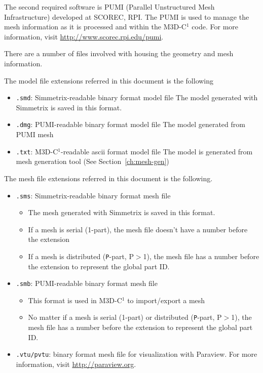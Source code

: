 The second required software is PUMI (Parallel Unstructured Mesh Infrastructure) developed at SCOREC, RPI. The PUMI is used to manage the mesh information as it is processed and within the M3D-C$^{1}$ code. For more information, visit \href{http://www.scorec.rpi.edu/pumi}{http://www.scorec.rpi.edu/pumi}. 

There are a number of files involved with housing the geometry and mesh information. 

The model file extensions referred in this document is the following
\begin{itemize}
\item \texttt{.smd}: Simmetrix-readable binary format model file  
\newline  The model generated with Simmetrix is saved in this format.
\item \texttt{.dmg}: PUMI-readable binary format model file
\newline	The model generated from PUMI mesh
\item	\texttt{.txt}: M3D-C$^{1}$-readable ascii format model file 
\newline	The model is generated from mesh generation tool (See Section~\ref{ch:mesh-gen})
\end{itemize}

The mesh file extensions referred in this document is the following.
\begin{itemize}
\item	\texttt{.sms}: Simmetrix-readable binary format mesh file
\begin{itemize}
\item	The mesh generated with Simmetrix is saved in this format.
\item	If a mesh is serial (1-part), the mesh file doesn't have a number before the extension
\item	If a mesh is distributed (\texttt{P}-part, P$>$1), the mesh file has a number before the extension to represent the global part ID.
\end{itemize}
\item	\texttt{.smb}: PUMI-readable binary format mesh file
\begin{itemize}
\item	This format is used in M3D-C$^{1}$ to import/export a mesh
\item	No matter if a mesh is serial (1-part) or distributed (\texttt{P}-part, P$>$1), the mesh file has a number before the extension to represent the global part ID.
\end{itemize}
\item \texttt{.vtu/pvtu}: binary format mesh file for visualization with Paraview. For more information, visit \href{http://paraview.org}{http://paraview.org}.
\end{itemize}

